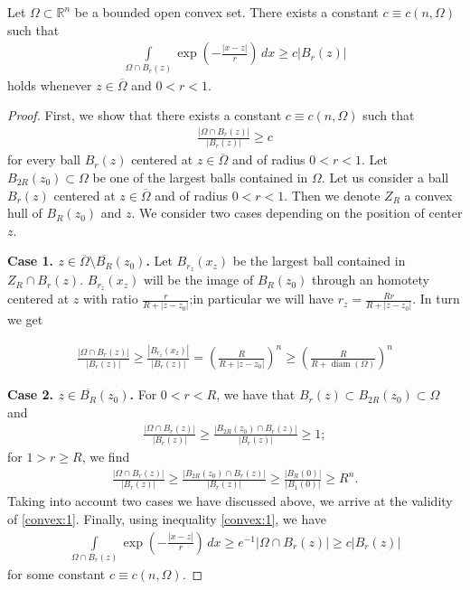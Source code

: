 \documentclass[reqno,12pt]{article}
\DeclareMathOperator{\diam}{diam}
\newcommand{\R}{\mathbb{R}}
\newcommand{\I}{\int\limits}
\begin{document}
\begin{prop}
    \label{prop:convex}
    Let $\Omega\subset \R^{n}$ be a bounded open convex set. There exists a constant $c\equiv c(n,\Omega)$ such that 
    \begin{align*}
        \I_{\Omega\cap B_{r}(z)}\exp\left( -\frac{|x-z|}{r} \right)\,dx 
        \geqslant
        c|B_{r}(z)|
    \end{align*}
    holds whenever $z\in\overline{\Omega}$ and $0<r<1$.
\end{prop}
\begin{proof}
    First, we show that there exists a constant $c\equiv c(n,\Omega)$ such that 
    \begin{align}
        \label{convex:1}
        \frac{|\Omega\cap B_{r}(z)|}{|B_{r}(z)|} \geqslant c
    \end{align}
    for every ball $B_{r}(z)$ centered at $z\in \overline{\Omega}$ and of radius $0<r<1$. Let $B_{2R}(z_0)\subset \Omega$ be one of the largest balls contained in $\Omega$.  Let us consider a ball $B_{r}(z)$ centered at $z\in \overline{\Omega}$ and of radius $0<r<1$. Then we denote $Z_{R}$ a convex hull of $B_{R}(z_0)$ and $z$. We consider two cases depending on the position of center $z$.  

    \textbf{Case 1. $z\in \overline{\Omega}\setminus \overline{B_{R}}(z_0)$.} Let $B_{r_{z}}(x_{z})$ be the largest ball contained in $Z_{R}\cap B_{r}(z)$. $B_{r_z}(x_z)$ will be the image of $B_R(z_0)$ through an homotety centered at $z$ with ratio $\frac{r}{R+|z-z_0|}$;in particular we will have $r_z=\frac{ Rr}{R+|z-z_0|}$. In turn we get

     \begin{align*}
        \frac{|\Omega\cap B_{r}(z)|}{|B_{r}(z)|}
        \geqslant
        \frac{|B_{r_{z}}(x_{z})|}{|B_{r}(z)|}
        =
        \left( \frac{R}{R + |z-z_0|} \right)^{n}
        \geqslant 
         \left( \frac{R}{R + \diam(\Omega)} \right)^{n}
    \end{align*}

   \textbf{Case 2. $z\in \overline{B_{R}}(z_0)$. } For $0<r < R$, we have that $B_{r}(z)\subset B_{2R}(z_0)\subset \Omega$ and
 \begin{align*}
     \frac{|\Omega\cap B_{r}(z)|}{|B_{r}(z)|}
     \geqslant
     \frac{|B_{2R}(z_0)\cap B_{r}(z)|}{|B_{r}(z)|} \geqslant 1;
 \end{align*}
 for $1> r\geqslant R$, we find 
  \begin{align*}
     \frac{|\Omega\cap B_{r}(z)|}{|B_{r}(z)|}
     \geqslant
     \frac{|B_{2R}(z_0)\cap B_{r}(z)|}{|B_{r}(z)|} 
     \geqslant
     \frac{|B_{R}(0)|}{|B_{1}(0)|}
     \geqslant R^{n}.
 \end{align*}
Taking into account two cases we have discussed above, we arrive at the validity of \eqref{convex:1}. Finally, using inequality \eqref{convex:1}, we have 
\begin{align*}
    \I_{\Omega\cap B_{r}(z)} \exp\left(-\frac{|x-z|}{r}\right)\,dx
    \geqslant
    e^{-1}|\Omega\cap B_{r}(z)| \geqslant c |B_{r}(z)|
\end{align*}
for some constant $c\equiv c(n,\Omega)$. 
\end{proof}
\end{document}

